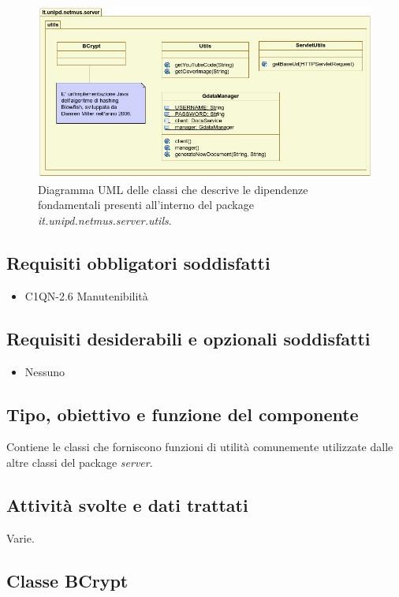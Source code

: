 \begin{figure}[!h]
  \centering
  \includegraphics[width=14cm]{img/DP/classes_server_utils.png}
\caption{Diagramma UML delle classi che descrive le dipendenze
fondamentali presenti all'interno del package
\emph{it.unipd.netmus.server.utils}.}
\end{figure}

\subsection*{Requisiti obbligatori soddisfatti}
\begin{itemize}
    \item C1QN-2.6 Manutenibilit\`a
\end{itemize}
\subsection*{Requisiti desiderabili e opzionali soddisfatti}
\begin{itemize}
    \item Nessuno
\end{itemize}
\subsection*{Tipo, obiettivo e funzione del componente}
Contiene le classi che forniscono funzioni di utilit\`a comunemente utilizzate
dalle altre classi del package \emph{server}.
\subsection*{Attivit\`a svolte e dati trattati}
Varie.

\subsection{Classe BCrypt}
